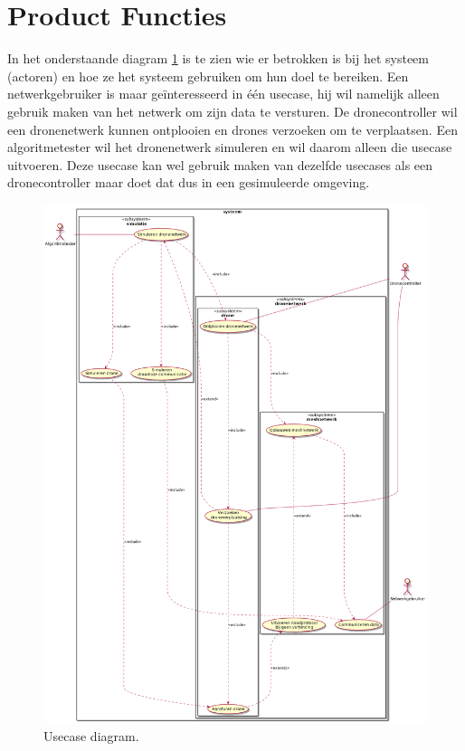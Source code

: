 \documentclass[a4paper, 11pt, oneside]{report}
\begin{document}
\section{Product Functies}
\label{inleiding:productfuncties}
In het onderstaande diagram \ref{fig:usecasediagram} is te zien wie er betrokken is bij het systeem (actoren) en hoe ze het systeem gebruiken om hun doel te bereiken.
Een netwerkgebruiker is maar geïnteresseerd in één usecase, hij wil namelijk alleen gebruik maken van het netwerk om zijn data te versturen.
De dronecontroller wil een dronenetwerk kunnen ontplooien en drones verzoeken om te verplaatsen.
Een algoritmetester wil het dronenetwerk simuleren en wil daarom alleen die usecase uitvoeren.
Deze usecase kan wel gebruik maken van dezelfde usecases als een dronecontroller maar doet dat dus in een gesimuleerde omgeving. 
\begin{figure}[H]
	\begin{center}\includegraphics[width=1\linewidth]{UML/out/usecase/usecasediagram/usecasediagram.png}\end{center}
	\caption{Usecase diagram.}
	\label{fig:usecasediagram}
\end{figure}
\end{document}
